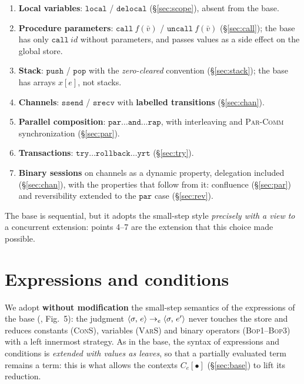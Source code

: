 \begin{enumerate}
\item \textbf{Local variables}: $\mathtt{local}$ / $\mathtt{delocal}$
  (\S\ref{sec:scope}), absent from the base.
\item \textbf{Procedure parameters}: $\mathtt{call}\ f(\bar v)$ /
  $\mathtt{uncall}\ f(\bar v)$ (\S\ref{sec:call}); the base has only
  $\mathtt{call}\ \mathit{id}$ without parameters, and passes values as a side
  effect on the global store.
\item \textbf{Stack}: $\mathtt{push}$ / $\mathtt{pop}$ with the
  \emph{zero-cleared} convention (\S\ref{sec:stack}); the base has arrays $x[e]$, not stacks.
\item \textbf{Channels}: $\mathtt{ssend}$ / $\mathtt{srecv}$ with
  \textbf{labelled transitions} (\S\ref{sec:chan}).
\item \textbf{Parallel composition}: $\mathtt{par}\ldots\mathtt{and}\ldots
  \mathtt{rap}$, with interleaving and \textsc{Par-Comm} synchronization
  (\S\ref{sec:par}).
\item \textbf{Transactions}: $\mathtt{try}\ldots\mathtt{rollback}\ldots
  \mathtt{yrt}$ (\S\ref{sec:try}).
\item \textbf{Binary sessions} on channels as a dynamic property, delegation
  included (\S\ref{sec:chan}), with the properties that follow from it: confluence
  (\S\ref{sec:par}) and reversibility extended to the $\mathtt{par}$ case
  (\S\ref{sec:rev}).
\end{enumerate}

\noindent
The base is sequential, but it adopts the small-step style \emph{precisely with a view to}
a concurrent extension: points 4--7 are the extension that this choice
made possible.

\section{Expressions and conditions}
\label{sec:esp}

We adopt \textbf{without modification} the small-step semantics of the expressions
of the base (\cite{LamiLaneseStefani2024}, Fig.~5): the judgment
$\langle \sigma,\, e \rangle \to_e \langle \sigma,\, e' \rangle$ never touches the store and reduces
constants (\textsc{ConS}), variables (\textsc{VarS}) and binary operators
(\textsc{Bop1}--\textsc{Bop3}) with a left innermost strategy. As in the
base, the syntax of expressions and conditions is \emph{extended with values as
leaves}, so that a partially evaluated term remains a term: this is what
allows the contexts $C_e[\bullet]$ (\S\ref{sec:base}) to lift its
reduction.

